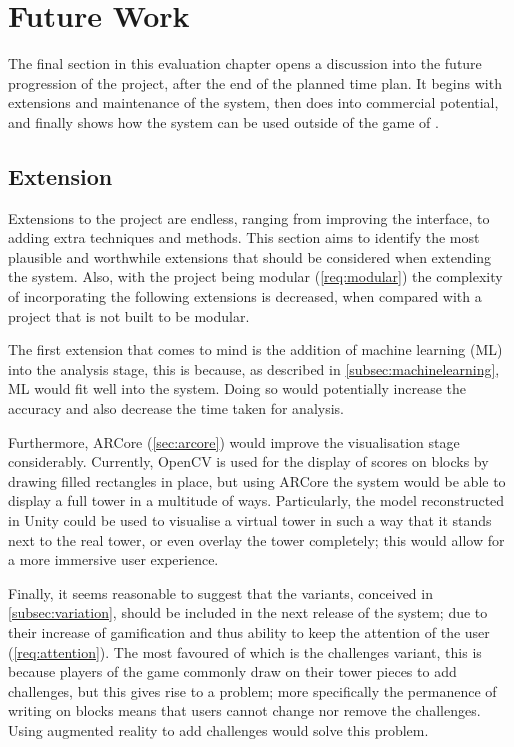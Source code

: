 \section{Future Work}

The final section in this evaluation chapter opens a discussion into the future progression of the project, after the end of the planned time plan. It begins with extensions and maintenance of the system, then does into commercial potential, and finally shows how the system can be used outside of the game of \jenga{}.

\subsection{Extension}

Extensions to the project are endless, ranging from improving the interface, to adding extra techniques and methods. This section aims to identify the most plausible and worthwhile extensions that should be considered when extending the system. Also, with the project being modular (\cref{req:modular}) the complexity of incorporating the following extensions is decreased, when compared with a project that is not built to be modular.

The first extension that comes to mind is the addition of machine learning (ML) into the analysis stage, this is because, as described in \cref{subsec:machinelearning}, ML would fit well into the system. Doing so would potentially increase the accuracy and also decrease the time taken for analysis.

Furthermore, ARCore (\cref{sec:arcore}) would improve the visualisation stage considerably. Currently, OpenCV is used for the display of scores on blocks by drawing filled rectangles in place, but using ARCore the system would be able to display a full tower in a multitude of ways. Particularly, the model reconstructed in Unity could be used to visualise a virtual tower in such a way that it stands next to the real tower, or even overlay the tower completely; this would allow for a more immersive user experience.

Finally, it seems reasonable to suggest that the variants, conceived in \cref{subsec:variation}, should be included in the next release of the system; due to their increase of gamification and thus ability to keep the attention of the user (\cref{req:attention}). The most favoured of which is the challenges variant, this is because players of the game commonly draw on their tower pieces to add challenges, but this gives rise to a problem; more specifically the permanence of writing on blocks means that users cannot change nor remove the challenges. Using augmented reality to add challenges would solve this problem.


